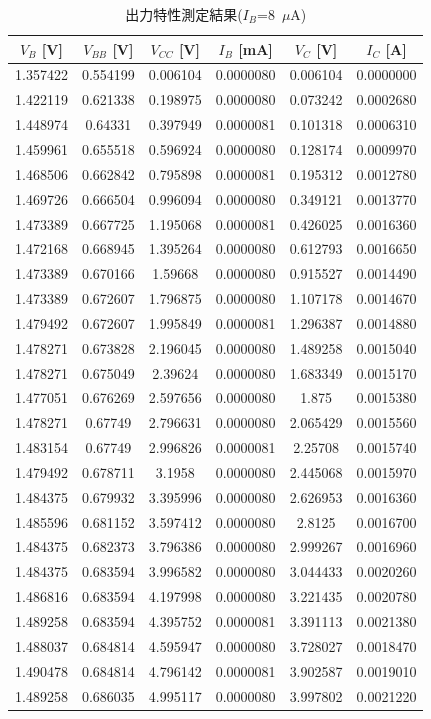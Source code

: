 \documentclass[11pt,dvipdfmx]{jarticle}
\begin{document}
		\begin{table}[H]
			\centering
			\caption{出力特性測定結果($I_B$=8\ $\mu$A)}
			\begin{tabular}{cccccc}
			\hline
			$V_B$ [V]& $V_{BB}$ [V]& $V_{CC}$ [V]& $I_B$ [mA]& $V_C$ [V]& $I_C$ [A]\\\hline\hline
			1.357422 & 0.554199 & 0.006104 & 0.0000080 & 0.006104 & 0.0000000 \\
			1.422119 & 0.621338 & 0.198975 & 0.0000080 & 0.073242 & 0.0002680 \\
			1.448974 & 0.64331 & 0.397949 & 0.0000081 & 0.101318 & 0.0006310 \\
			1.459961 & 0.655518 & 0.596924 & 0.0000080 & 0.128174 & 0.0009970 \\
			1.468506 & 0.662842 & 0.795898 & 0.0000081 & 0.195312 & 0.0012780 \\
			1.469726 & 0.666504 & 0.996094 & 0.0000080 & 0.349121 & 0.0013770 \\
			1.473389 & 0.667725 & 1.195068 & 0.0000081 & 0.426025 & 0.0016360 \\
			1.472168 & 0.668945 & 1.395264 & 0.0000080 & 0.612793 & 0.0016650 \\
			1.473389 & 0.670166 & 1.59668 & 0.0000080 & 0.915527 & 0.0014490 \\
			1.473389 & 0.672607 & 1.796875 & 0.0000080 & 1.107178 & 0.0014670 \\
			1.479492 & 0.672607 & 1.995849 & 0.0000081 & 1.296387 & 0.0014880 \\
			1.478271 & 0.673828 & 2.196045 & 0.0000080 & 1.489258 & 0.0015040 \\
			1.478271 & 0.675049 & 2.39624 & 0.0000080 & 1.683349 & 0.0015170 \\
			1.477051 & 0.676269 & 2.597656 & 0.0000080 & 1.875 & 0.0015380 \\
			1.478271 & 0.67749 & 2.796631 & 0.0000080 & 2.065429 & 0.0015560 \\
			1.483154 & 0.67749 & 2.996826 & 0.0000081 & 2.25708 & 0.0015740 \\
			1.479492 & 0.678711 & 3.1958 & 0.0000080 & 2.445068 & 0.0015970 \\
			1.484375 & 0.679932 & 3.395996 & 0.0000080 & 2.626953 & 0.0016360 \\
			1.485596 & 0.681152 & 3.597412 & 0.0000080 & 2.8125 & 0.0016700 \\
			1.484375 & 0.682373 & 3.796386 & 0.0000080 & 2.999267 & 0.0016960 \\
			1.484375 & 0.683594 & 3.996582 & 0.0000080 & 3.044433 & 0.0020260 \\
			1.486816 & 0.683594 & 4.197998 & 0.0000080 & 3.221435 & 0.0020780 \\
			1.489258 & 0.683594 & 4.395752 & 0.0000081 & 3.391113 & 0.0021380 \\
			1.488037 & 0.684814 & 4.595947 & 0.0000080 & 3.728027 & 0.0018470 \\
			1.490478 & 0.684814 & 4.796142 & 0.0000081 & 3.902587 & 0.0019010 \\
			1.489258 & 0.686035 & 4.995117 & 0.0000080 & 3.997802 & 0.0021220 \\
			\hline
			\end{tabular}
			\label{tab:出力特性測定結果8}
		\end{table}
\end{document}

